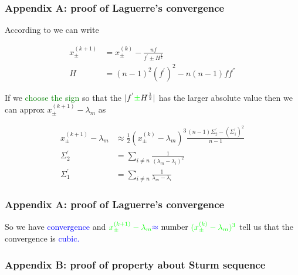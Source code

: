 \documentclass{beamer}
\theoremstyle{definition} \newtheorem{de}{Def}
\theoremstyle{remark} \newtheorem{os}[de]{Remark}
\theoremstyle{plain} \newtheorem{te}[de]{Teo}
\theoremstyle{plain} \newtheorem{co}[de]{Cor}
\theoremstyle{plain} \newtheorem{pr}[de]{Prop}
\theoremstyle{plain} \newtheorem{lem}[de]{Lemm}
\theoremstyle{remark} \newtheorem{rem}[de]{Remark}
\begin{document}
\begin{frame}[label=LagProof]
  \frametitle{Appendix A: proof of Laguerre's convergence}

  According to \cite[p.444]{bookWilkinson} we can write 

  \begin{align*}
    x_{\pm}^{(k+1)} &= x_{\pm}^{(k)} - \frac{n f}{f^{'} \pm H^{\frac{1}{2}}} \\
    H &= (n-1)^2 (f^{'})^2 -n(n-1)f f^{''}
  \end{align*}

  If we \textcolor{green}{choose the sign} so that the $| f^{'} \textcolor{green}{\pm} H^{\frac{1}{2}} |$ has the larger absolute value then we can approx $x_{\pm}^{(k+1)} - \lambda_m$ as

  \begin{align*}
    x_{\pm}^{(k+1)} - \lambda_m &\approx \frac{1}{2}(x_{\pm}^{(k)} - \lambda_m)^3 \frac{(n-1)\Sigma_2^{'} - (\Sigma_1^{'})^2}{n-1}\\
    \Sigma_2^{'} &= \sum_{i\ne n} \frac{1}{(\lambda_m - \lambda_i)^2}\\
    \Sigma_1^{'} &= \sum_{i\ne n} \frac{1}{\lambda_m - \lambda_i}
  \end{align*}

\end{frame}

\begin{frame}
  \frametitle{Appendix A: proof of Laguerre's convergence}

  So we have \textcolor{blue}{convergence} and $\textcolor{green}{x_{\pm}^{(k+1)} - \lambda_m} \textcolor{blue}{\approx} \text{ number } \textcolor{green}{(x_{\pm}^{(k)} - \lambda_m)^3}$ tell us that the convergence is \textcolor{blue}{cubic.}

  \hyperlink{BeforeLagProof}{}
\end{frame}

\begin{frame}[label=SturmSequence]
  \frametitle{Appendix B: proof of property about Sturm sequence}

  
  \hyperlink{BeforeSturmSequence}{}

\end{frame}
\end{document}
